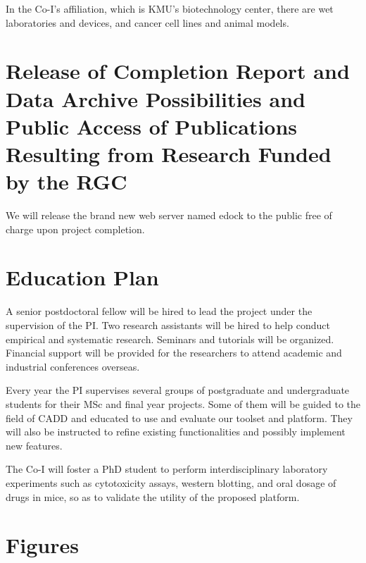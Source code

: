 \documentclass[a4paper,12pt]{article}
\begin{document}
In the Co-I's affiliation, which is KMU's biotechnology center, there are wet laboratories and devices, and cancer cell lines and animal models.

\section*{Release of Completion Report and Data Archive Possibilities and Public Access of Publications Resulting from Research Funded by the RGC}

We will release the brand new web server named edock to the public free of charge upon project completion.


\section*{Education Plan}

A senior postdoctoral fellow will be hired to lead the project under the supervision of the PI. Two research assistants will be hired to help conduct empirical and systematic research. Seminars and tutorials will be organized. Financial support will be provided for the researchers to attend academic and industrial conferences overseas.

Every year the PI supervises several groups of postgraduate and undergraduate students for their MSc and final year projects. Some of them will be guided to the field of CADD and educated to use and evaluate our toolset and platform. They will also be instructed to refine existing functionalities and possibly implement new features.

The Co-I will foster a PhD student to perform interdisciplinary laboratory experiments such as cytotoxicity assays, western blotting, and oral dosage of drugs in mice, so as to validate the utility of the proposed platform.

\linespread{0.5}
\footnotesize



\newpage
\section*{Figures}
\end{document}
